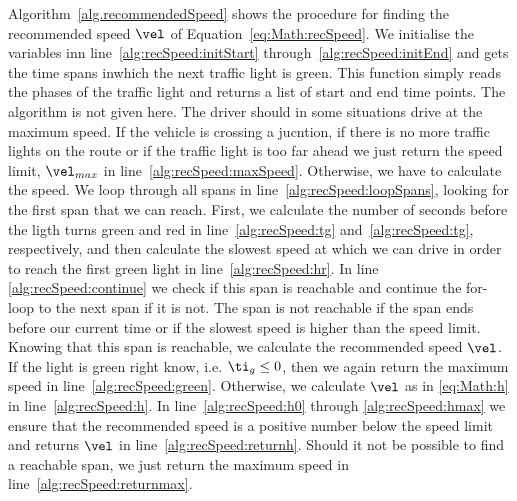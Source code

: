 Algorithm~\ref{alg.recommendedSpeed} shows the procedure for finding the recommended speed $\vel$ of Equation~\ref{eq:Math:recSpeed}.
We initialise the variables inn line~\ref{alg:recSpeed:initStart} through~\ref{alg:recSpeed:initEnd} and gets the time spans inwhich the next traffic light is green. 
This function simply reads the phases of the traffic light and returns a list of start and end time points. 
The algorithm is not given here.
The driver should in some situations drive at the maximum speed. If the vehicle is crossing a jucntion, if there is no more traffic lights on the route or if the traffic light is too far ahead we just return the speed limit, $\vel_{max}$ in line~\ref{alg:recSpeed:maxSpeed}.
Otherwise, we have to calculate the speed. 
We loop through all spans in line~\ref{alg:recSpeed:loopSpans}, looking for the first span that we can reach.
First, we calculate the number of seconds before the ligth turns green and red in line~\ref{alg:recSpeed:tg} and~\ref{alg:recSpeed:tg}, respectively, and then calculate the slowest speed at which we can drive in order to reach the first green light in line~\ref{alg:recSpeed:hr}.
In line \ref{alg:recSpeed:continue} we check if this span is reachable and continue the for-loop to the next span if it is not. 
The span is not reachable if the span ends before our current time or if the slowest speed is higher than the speed limit.
Knowing that this span is reachable, we calculate the recommended speed $\vel$.
If the light is green right know, i.e. $\ti_g \leq 0$, then we again return the maximum speed in line~\ref{alg:recSpeed:green}. Otherwise, we calculate $\vel$ as in \eqref{eq:Math:h} in line~\ref{alg:recSpeed:h}.
In line~\ref{alg:recSpeed:h0} through \ref{alg:recSpeed:hmax} we ensure that the recommended speed is a positive number below the speed limit and returns $\vel$ in line~\ref{alg:recSpeed:returnh}.
Should it not be possible to find a reachable span, we just return the maximum speed in line~\ref{alg:recSpeed:returnmax}.

